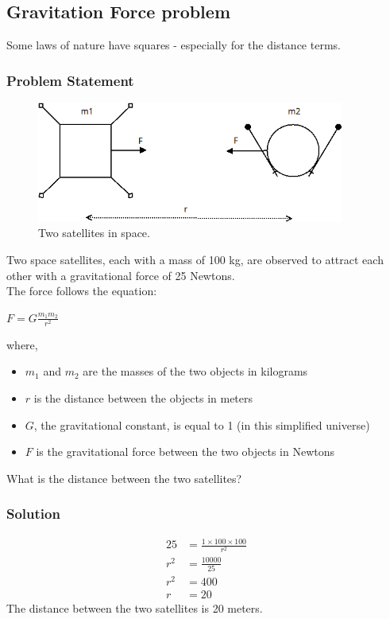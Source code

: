 \documentclass{hw}
\begin{document}
\newpage
\subsection*{\normalsize Gravitation Force problem}
Some laws of nature have squares - especially for the distance terms.

\subsubsection*{\normalsize Problem Statement}

\begin{figure}[h]
    \centering
    \includegraphics[width=0.9\textwidth]{dia/radicals-satellites.png}
    \caption{Two satellites in space.}
    \label{fig:satellites}
\end{figure}

Two space satellites, each with a mass of 100 kg, are observed to attract each other with a gravitational force of 25 Newtons.\\
The force follows the equation:

{\centering
$F = G \frac{m_1 m_2}{r^2}$
\par}

where,
\begin{itemize}
    \item $m_1$ and $m_2$ are the masses of the two objects in kilograms
    \item $r$ is the distance between the objects in meters
    \item $G$, the gravitational constant, is equal to 1 (in this simplified universe)
    \item $F$ is the gravitational force between the two objects in Newtons 
\end{itemize}
\bigskip
What is the distance between the two satellites?

\subsubsection*{\normalsize Solution}
\begin{align*}
25 &= \frac{1 \times 100 \times 100}{r^2} \\
r^2 &= \frac{10000}{25} \\
r^2 &= 400 \\
r &= 20
\end{align*}
The distance between the two satellites is 20 meters.
\end{document}
